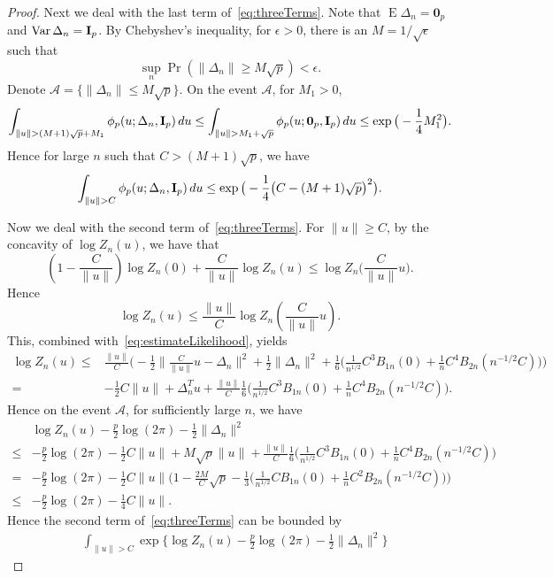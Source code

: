 \documentclass[3p]{elsarticle}
\DeclareMathOperator{\myE}{E}
\DeclareMathOperator{\myVar}{Var}
\theoremstyle{plain}
\theoremstyle{definition}
\theoremstyle{remark}
\begin{document}
\begin{proof}
    Next we deal with the last term of~\eqref{eq:threeTerms}.
Note that $\myE \Delta_n=\textbf{0}_p$ and $\myVar \Delta_n = \BI_p$. By Chebyshev's inequality, for $\epsilon>0$, there is an $M=1/\sqrt{\epsilon}$ such that $$\sup_n\Pr(\|\Delta_n\|\geq M\sqrt{p})<\epsilon.$$
Denote $\mathcal{A}=\{\|\Delta_n\|\leq M\sqrt{p}\}$.
On the event $\mathcal{A}$, for $M_1>0$,
$$
\int_{\|u\|>(M+1)\sqrt{p}+M_1} \phi_p(u;\Delta_n,\BI_p)\, du\leq \int_{\|u\|>M_1+\sqrt{p}} \phi_p(u;\mathbf{0}_p,\BI_p)\, du\leq \exp \big(-\frac{1}{4}M_1^2 \big).
$$
Hence for large $n$ such that $C>(M+1)\sqrt{p}$, we have
$$
\int_{\|u\|>C} \phi_p(u;\Delta_n,\BI_p)\, du\leq \exp \big(-\frac{1}{4}\big(C-(M+1)\sqrt{p}\big)^2 \big).
$$

Now we deal with the second term of~\eqref{eq:threeTerms}.
For $\|u\|\geq C$, by the concavity of $\log Z_n(u)$, we have that
$$
(1-\frac{C}{\|u\|})\log Z_n(0)+\frac{C}{\|u\|}\log Z_n(u)
\leq 
\log Z_n\big(\frac{C}{\|u\|}u\big).
$$
Hence 
$$\log Z_n(u)\leq \frac{\|u\|}{C} \log Z_n(\frac{C}{\|u\|} u).$$
This, combined with~\eqref{eq:estimateLikelihood}, yields
$$
\begin{aligned}
    \log Z_n(u)\leq& 
    \frac{\|u\|}{C}\Big(
    -\frac{1}{2}\big\|\frac{C}{\|u\|}u-\Delta_n \big\|^2+\frac{1}{2}\|\Delta_n\|^2+
    \frac{1}{6}\big(\frac{1}{n^{1/2}}C^3 B_{1n}(0)+\frac{1}{n}C^4 B_{2n}(n^{-1/2}C)\big)
    \Big)\\
    =&
    -\frac{1}{2} C\|u\|+ \Delta_n^T u
    +\frac{\|u\|}{C}\frac{1}{6}\big(\frac{1}{n^{1/2}}C^3 B_{1n}(0)+\frac{1}{n}C^4 B_{2n}(n^{-1/2}C)\big).
\end{aligned}
$$
Hence on the event $\mathcal{A}$, for sufficiently large $n$, we have
$$
\begin{aligned}
    &\log Z_n(u) -\frac{p}{2}\log (2\pi)-\frac{1}{2}\|\Delta_n\|^2\\
    \leq&
-\frac{p}{2}\log (2\pi)
    -\frac{1}{2} C\|u\|+ M\sqrt{p} \| u\|
    +\frac{\|u\|}{C}\frac{1}{6}\big(\frac{1}{n^{1/2}}C^3 B_{1n}(0)+\frac{1}{n}C^4 B_{2n}(n^{-1/2}C)\big)\\
    =&
-\frac{p}{2}\log (2\pi)
    -\frac{1}{2} C\|u\|\Big(1- \frac{2M}{C}\sqrt{p} 
    -\frac{1}{3}\big(\frac{1}{n^{1/2}}C B_{1n}(0)+\frac{1}{n}C^2 B_{2n}(n^{-1/2}C)\big)\Big)\\
    \leq&
-\frac{p}{2}\log (2\pi)
    -\frac{1}{4} C\|u\|.
\end{aligned}
$$
Hence the second term of~\eqref{eq:threeTerms} can be bounded by
$$
\begin{aligned}
    &\int_{\|u\|> C}
\exp\big\{\log Z_n(u) -\frac{p}{2}\log (2\pi)-\frac{1}{2}\|\Delta_n\|^2\big\}

\end{aligned}$$
\end{proof}
\end{document}
